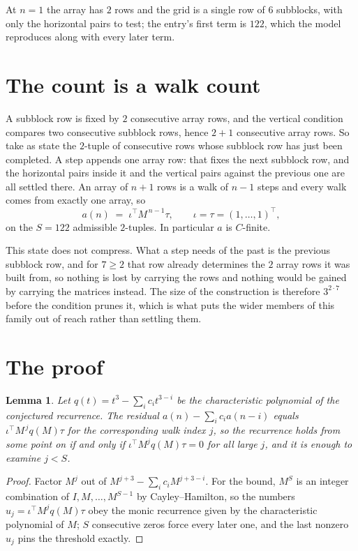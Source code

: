 \documentclass[11pt,a4paper]{article}
\theoremstyle{plain}
\newtheorem{lemma}[theorem]{Lemma}
\theoremstyle{definition}
\begin{document}
At $n=1$ the array has $2$ rows and the grid is a single row of $6$
subblocks, with only the horizontal pairs to test; the entry's first term is
$122$, which the model reproduces along with every later term.

\section{The count is a walk count}

A subblock row is fixed by $2$ consecutive array rows, and the vertical condition compares
two consecutive subblock rows, hence $2+1$ consecutive array rows. So take as state the
$2$-tuple of consecutive rows whose subblock row has just been completed. A step appends one
array row: that fixes the next subblock row, and the horizontal pairs inside it and the
vertical pairs against the previous one are all settled there. An array of $n+1$ rows is
a walk of $n-1$ steps and every walk comes from exactly one array, so
\[
a(n)\;=\;\iota^{\!\top}M^{\,n-1}\tau,\qquad\iota=\tau=(1,\dots,1)^{\!\top},
\]
on the $S=122$ admissible $2$-tuples. In particular $a$ is $C$-finite.

This state does not compress. What a step needs of the past is the previous subblock row, and
for $7\ge2$ that row already determines the $2$ array rows it was built from, so nothing
is lost by carrying the rows and nothing would be gained by carrying the matrices instead. The
size of the construction is therefore $3^{2\cdot7}$ before the condition prunes
it, which is what puts the wider members of this family out of reach rather than settling them.

\section{The proof}

\begin{lemma}\label{lem:crit}
Let $q(t)=t^{3}-\sum_i c_it^{3-i}$ be the characteristic polynomial of the
conjectured recurrence. The residual $a(n)-\sum_ic_ia(n-i)$ equals
$\iota^{\!\top}M^{\,j}q(M)\tau$ for the corresponding walk index $j$, so the recurrence
holds from some point on if and only if $\iota^{\!\top}M^{j}q(M)\tau=0$ for all large $j$,
and it is enough to examine $j<S$.
\end{lemma}

\begin{proof}
Factor $M^{j}$ out of $M^{j+3}-\sum_ic_iM^{j+3-i}$. For the bound, $M^{S}$
is an integer combination of $I,M,\dots,M^{S-1}$ by Cayley--Hamilton, so the numbers
$u_j=\iota^{\!\top}M^{j}q(M)\tau$ obey the monic recurrence given by the characteristic
polynomial of $M$; $S$ consecutive zeros force every later one, and the last nonzero $u_j$
pins the threshold exactly.
\end{proof}
\end{document}

